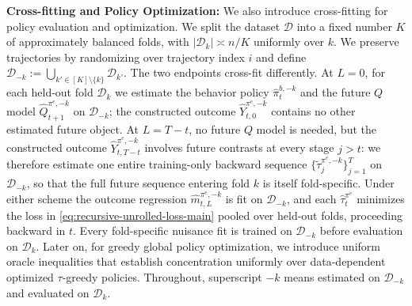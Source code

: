 \documentclass[opre,nonblindrev]{informs4}
\newcommand{\blipadv}{\tau}
\begin{document}
\textbf{Cross-fitting and Policy Optimization:} %
We also introduce cross-fitting for policy evaluation and optimization. We split the dataset $\mathcal{D}$ into a fixed number $K$ of approximately balanced folds, with $|\mathcal D_k|\asymp n/K$ uniformly over $k$.
We preserve trajectories by randomizing over trajectory index $i$ and define
$\mathcal{D}_{-k} := \bigcup_{k'\in[K]\setminus\{k\}}\mathcal{D}_{k'}$.
The two endpoints cross-fit differently. At $L=0$, for each held-out fold $\mathcal{D}_k$ we
estimate the behavior policy $\hat\pi_t^{b,-k}$ and the future
$Q$ model $\hat Q_{t+1}^{\pi^e,-k}$ on $\mathcal{D}_{-k}$; the constructed
outcome $\hat Y_{t,0}^{\pi^e,-k}$ contains no other estimated future
object. At $L=T-t$, no future $Q$ model is needed, but the constructed
outcome $\hat Y_{t,T-t}^{\pi^e,-k}$ involves future contrasts at every
stage $j>t$: we therefore estimate one entire training-only backward sequence
$\{\widetilde\tau_j^{\pi^e,-k}\}_{j=1}^{T}$ on $\mathcal{D}_{-k}$, so that
the full future sequence entering fold $k$ is itself fold-specific. Under
either scheme the outcome regression $\hat m_{t,L}^{\pi^e,-k}$ is fit on
$\mathcal{D}_{-k}$, and each $\hat\blipadv_t^{\pi^e}$ minimizes the loss in
\cref{eq:recursive-unrolled-loss-main} pooled over held-out folds, proceeding
backward in $t$. Every fold-specific nuisance fit is trained on $\mathcal D_{-k}$
before evaluation on $\mathcal D_k$. Later on, for greedy global policy optimization, we introduce uniform oracle inequalities that establish concentration uniformly over data-dependent optimized $\blipadv$-greedy policies. Throughout, superscript $-k$
means estimated on $\mathcal{D}_{-k}$ and evaluated on $\mathcal{D}_k$.
\end{document}
